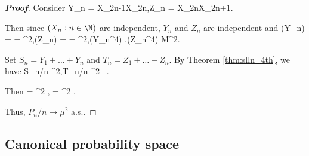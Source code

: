 \begin{proof}[\bf Proof]
Consider
\be
Y_n = X_{2n-1}X_{2n},\quad Z_n = X_{2n}X_{2n+1}.
\ee

Then since $(X_n : n \in \N)$ are independent, $Y_n$ and $Z_n$ are independent and
\be
\E(Y_n) = \E{}\E{} = \mu^2,\quad \E(Z_n) = \E{}\E{} = \mu^2,\quad \E(Y_n^4) ,\E(Z_n^4) \leq M^2.
\ee

Set $S_n = Y_1+\dots + Y_n$ and $T_n = Z_1+\dots + Z_n$. By Theorem \ref{thm:slln_4th}, we have
\be
S_n/n \to \mu^2,\quad T_n/n \to \mu^2 \ .
\ee

Then
\be
{} =  \to \mu^2 ,\quad {} =  \to \mu^2 ,\ 
\ee

Thus, $P_{n}/n \to \mu^2$ a.s..
\end{proof}




\subsection{Canonical probability space}%

